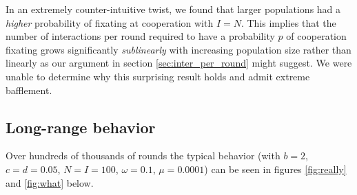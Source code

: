 \documentclass{amsart}
\begin{document}
In an extremely counter-intuitive twist, we found that larger
populations had a \emph{higher} probability of fixating at cooperation
with $I=N$. This implies that the number of interactions per round
required to have a probability $p$ of cooperation fixating grows
significantly \emph{sublinearly} with increasing population size
rather than linearly as our argument in section
\ref{sec:inter_per_round} might suggest. We were unable to determine why
this surprising result holds and admit extreme bafflement.

\subsection{Long-range behavior}
\label{sec:longrange}
Over hundreds of thousands of rounds the typical behavior (with $b=2$,
$c = d = 0.05$, $N = I = 100$, $\omega = 0.1$, $\mu = 0.0001$) can be
seen in figures \ref{fig:really} and \ref{fig:what} below.
\end{document}
